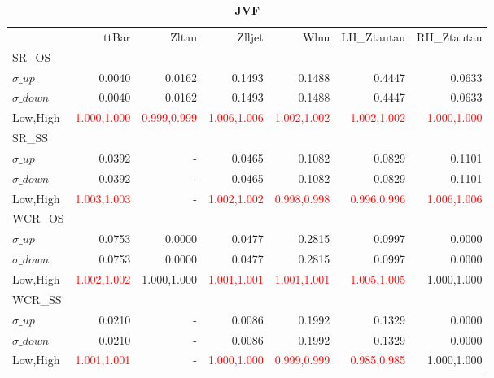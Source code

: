 \documentclass[11pt,oneside,a4paper]{article}
\begin{document}
\begin{table}
\caption{\bf{JVF}}
\centering
\begin{tabular}{lrrrrrr}
& ttBar & Zltau & Zlljet & Wlnu & LH\_Ztautau & RH\_Ztautau \\

SR\_OS &  &  &  &  &  &  \\
$\sigma\_up$ & 0.0040 & 0.0162 & 0.1493 & 0.1488 & 0.4447 & 0.0633 \\
$\sigma\_down$ & 0.0040 & 0.0162 & 0.1493 & 0.1488 & 0.4447 & 0.0633 \\
Low,High & \textcolor{red}{1.000,1.000} & \textcolor{red}{0.999,0.999} & \textcolor{red}{1.006,1.006} & \textcolor{red}{1.002,1.002} & \textcolor{red}{1.002,1.002} & \textcolor{red}{1.000,1.000} \\

\hline
SR\_SS &  &  &  &  &  &  \\
$\sigma\_up$ & 0.0392 & - & 0.0465 & 0.1082 & 0.0829 & 0.1101 \\
$\sigma\_down$ & 0.0392 & - & 0.0465 & 0.1082 & 0.0829 & 0.1101 \\
Low,High & \textcolor{red}{1.003,1.003} & - & \textcolor{red}{1.002,1.002} & \textcolor{red}{0.998,0.998} & \textcolor{red}{0.996,0.996} & \textcolor{red}{1.006,1.006} \\

\hline
WCR\_OS &  &  &  &  &  &  \\
$\sigma\_up$ & 0.0753 & 0.0000 & 0.0477 & 0.2815 & 0.0997 & 0.0000 \\
$\sigma\_down$ & 0.0753 & 0.0000 & 0.0477 & 0.2815 & 0.0997 & 0.0000 \\
Low,High & \textcolor{red}{1.002,1.002} & 1.000,1.000 & \textcolor{red}{1.001,1.001} & \textcolor{red}{1.001,1.001} & \textcolor{red}{1.005,1.005} & 1.000,1.000 \\

\hline
WCR\_SS &  &  &  &  &  &  \\
$\sigma\_up$ & 0.0210 & - & 0.0086 & 0.1992 & 0.1329 & 0.0000 \\
$\sigma\_down$ & 0.0210 & - & 0.0086 & 0.1992 & 0.1329 & 0.0000 \\
Low,High & \textcolor{red}{1.001,1.001} & - & \textcolor{red}{1.000,1.000} & \textcolor{red}{0.999,0.999} & \textcolor{red}{0.985,0.985} & 1.000,1.000 \\
\end{tabular}
\end{table}
\end{document}
